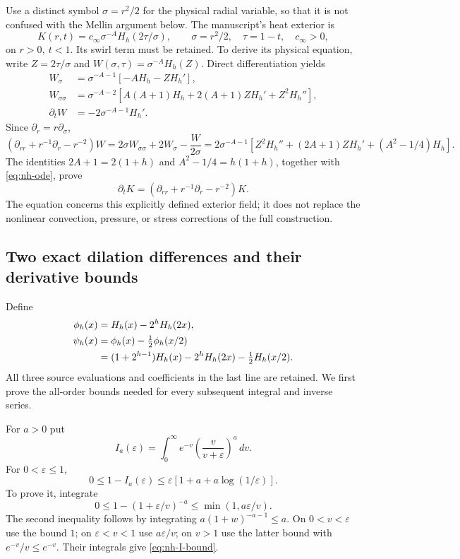 Use a distinct symbol \(\sigma=r^2/2\) for the physical radial variable,
so that it is not confused with the Mellin argument below. The manuscript's
heat exterior is
\begin{equation}\label{eq:nh-physical}
 K(r,t)=c_\infty \sigma^{-A}H_h(2\tau/\sigma),\qquad
 \sigma=r^2/2,\quad \tau=1-t,\quad c_\infty>0 ,
\end{equation}
on \(r>0,\ t<1\). Its swirl term must be retained. To derive its
physical equation, write \(Z=2\tau/\sigma\) and
\(W(\sigma,\tau)=\sigma^{-A}H_h(Z)\). Direct differentiation yields
\begin{align*}
 W_\sigma&=\sigma^{-A-1}[-AH_h-ZH_h'],\\
 W_{\sigma\sigma}
 &=\sigma^{-A-2}[A(A+1)H_h+2(A+1)ZH_h'+Z^2H_h''],\\
 \partial_t W&=-2\sigma^{-A-1}H_h'.
\end{align*}
Since \(\partial_r=r\partial_\sigma\),
\[
 (\partial_{rr}+r^{-1}\partial_r-r^{-2})W
 =2\sigma W_{\sigma\sigma}+2W_\sigma-\frac{W}{2\sigma}
 =2\sigma^{-A-1}
   [Z^2H_h''+(2A+1)ZH_h'+(A^2-1/4)H_h].
\]
The identities \(2A+1=2(1+h)\) and \(A^2-1/4=h(1+h)\), together
with \eqref{eq:nh-ode}, prove
\begin{equation}\label{eq:nh-swirl-heat}
 \partial_tK=(\partial_{rr}+r^{-1}\partial_r-r^{-2})K .
\end{equation}
The equation concerns this explicitly defined exterior field; it does not
replace the nonlinear convection, pressure, or stress corrections of the
full construction.

\subsection{Two exact dilation differences and their derivative bounds}

Define
\begin{align}
 \phi_h(x)&=H_h(x)-2^hH_h(2x),\label{eq:nh-phi}\\
 \psi_h(x)&=\phi_h(x)-\tfrac12\phi_h(x/2)\notag\\
 &=(1+2^{h-1})H_h(x)-2^hH_h(2x)-\tfrac12H_h(x/2).
 \label{eq:nh-psi}
\end{align}
All three source evaluations and coefficients in the last line are retained.
We first prove the all-order bounds needed for every subsequent integral
and inverse series.

For \(a>0\) put
\[
 I_a(\varepsilon)=\int_0^\infty e^{-v}
                  \left(\frac v{v+\varepsilon}\right)^a\,dv .
\]
For \(0<\varepsilon\le1\),
\begin{equation}\label{eq:nh-I-bound}
 0\le1-I_a(\varepsilon)
 \le\varepsilon[1+a+a\log(1/\varepsilon)].
\end{equation}
To prove it, integrate
\[
 0\le1-(1+\varepsilon/v)^{-a}
       \le\min(1,a\varepsilon/v).
\]
The second inequality follows by integrating
\(a(1+w)^{-a-1}\le a\). On \(0<v<\varepsilon\) use the bound \(1\);
on \(\varepsilon<v<1\) use \(a\varepsilon/v\); on \(v>1\) use the
latter bound with \(e^{-v}/v\le e^{-v}\). Their integrals give
\eqref{eq:nh-I-bound}.

